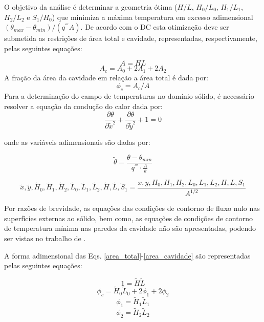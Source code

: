 \documentclass[12pt,A4,A4pt]{article}
\begin{document}
O objetivo da análise é determinar a geometria ótima ($H/L$, $H_{0}/L_{0}$, $H_{1}/L_{1}$, $H_{2}/L_{2}$ e $S_{1}/H_{0}$) que minimiza a máxima temperatura em excesso adimensional $(\theta_{max} - \theta_{min})/(q^{'''}A)$. De acordo com o DC esta otimização deve ser submetida as restrições de área total e cavidade, representadas, respectivamente, pelas seguintes equações:

\begin{equation}
A = HL \label{area_total}
\end{equation}
\begin{equation}
A_{c} = A_{0} + 2A_{1} + 2A_{2} \label{area_cavidade}
\end{equation}
A fração da área da cavidade em relação a área total é dada por:
\begin{equation}
\phi_{c} = A_{c}/A \label{fi}
\end{equation}
Para a determinação do campo de temperaturas no domínio sólido, é necessário resolver a equação da condução do calor dada por:
\begin{equation}
\frac{\partial \theta}{\partial \tilde{x}^{2}}+\frac{\partial \theta}{\partial \tilde{y}^{2}}+1=0\label{calor}
\end{equation}

onde as variáveis adimensionais são dadas por:

\begin{equation}
\tilde{\theta} = \frac{\theta - \theta_{min}}{q^{'''}\cdot\frac{A}{k}}\label{tadim}
\end{equation}

\begin{equation}
\tilde{x},\tilde{y},\tilde{H}_{0},\tilde{H}_{1},\tilde{H}_{2},\tilde{L}_{0},\tilde{L}_{1},\tilde{L}_{2},\tilde{H},\tilde{L},\tilde{S}_{1} = \frac{x,y,H_{0},H_{1},H_{2},L_{0},L_{1},L_{2},H,L,S_{1}}{A^{1/2}}\label{vadim}
\end{equation}

Por razões de brevidade, as equações das condições de contorno de fluxo nulo nas superfícies externas ao sólido, bem como, as equações de condições de contorno de temperatura mínima nas paredes da cavidade não são apresentadas, podendo ser vistas no trabalho de  \cite{Gonzales2015cilamce}.

A forma adimensional das Eqs. \ref{area_total}-\ref{area_cavidade} são representadas pelas seguintes equações:

\begin{equation}
1  = \tilde{H}\tilde{L}\label{total_area_adim}
\end{equation}
\begin{equation}
\phi_{c}=\tilde{H}_{0}\tilde{L}_{0}+2\phi_{1}+2\phi_{2}\label{fi_c}
\end{equation}
\begin{equation}
\phi_{1}=\tilde{H}_{1}\tilde{L}_{1}\label{fi_1}
\end{equation}
\begin{equation}
\phi_{2}=\tilde{H}_{2}\tilde{L}_{2}\label{fi_2}
\end{equation}
\end{document}
